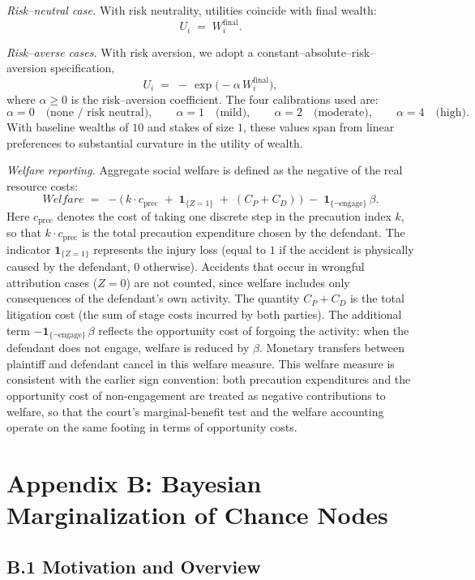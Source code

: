 \documentclass{article}
\begin{document}
\emph{Risk–neutral case.} With risk neutrality, utilities coincide with final wealth:
\[
U_i \;=\; W_i^{\mathrm{final}}.
\]

\emph{Risk–averse cases.} With risk aversion, we adopt a constant–absolute–risk–aversion specification,
\[
U_i \;=\; -\,\exp\!\bigl(-\alpha\,W_i^{\mathrm{final}}\bigr),
\]
where $\alpha\ge 0$ is the risk–aversion coefficient. The four calibrations used are:
\[
\alpha = 0 \quad\text{(none / risk neutral)},\qquad
\alpha = 1 \quad\text{(mild)},\qquad
\alpha = 2 \quad\text{(moderate)},\qquad
\alpha = 4 \quad\text{(high)}.
\]
With baseline wealths of $10$ and stakes of size $1$, these values span from linear preferences to substantial curvature in the utility of wealth.

\emph{Welfare reporting.} Aggregate social welfare is defined as the negative of the real resource costs:
\[
Welfare \;=\; -\bigl(\,k \cdot c_{\mathrm{prec}} \;+\; \mathbf{1}_{\{Z=1\}} \;+\; (C_P+C_D)\,\bigr)
\;-\;\mathbf{1}_{\{\neg \text{engage}\}}\,\beta.
\]
Here $c_{\mathrm{prec}}$ denotes the cost of taking one discrete step in the precaution index $k$, so that $k \cdot c_{\mathrm{prec}}$ is the total precaution expenditure chosen by the defendant. The indicator $\mathbf{1}_{\{Z=1\}}$ represents the injury loss (equal to $1$ if the accident is physically caused by the defendant, $0$ otherwise). Accidents that occur in wrongful attribution cases ($Z=0$) are not counted, since welfare includes only consequences of the defendant’s own activity. The quantity $C_P+C_D$ is the total litigation cost (the sum of stage costs incurred by both parties). The additional term $-\mathbf{1}_{\{\neg \text{engage}\}}\,\beta$ reflects the opportunity cost of forgoing the activity: when the defendant does not engage, welfare is reduced by $\beta$. Monetary transfers between plaintiff and defendant cancel in this welfare measure. This welfare measure is consistent with the earlier sign convention: both precaution expenditures and the opportunity cost of non-engagement are treated as negative contributions to welfare, so that the court’s marginal-benefit test and the welfare accounting operate on the same footing in terms of opportunity costs.

\section*{Appendix B: Bayesian Marginalization of Chance Nodes}

\subsection*{B.1 Motivation and Overview}
\end{document}
